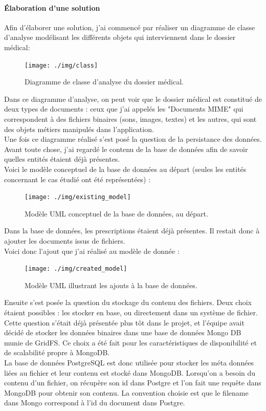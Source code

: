 \paragraph{Élaboration d'une solution\\}
Afin d'élaborer une solution, j'ai commencé par réaliser un diagramme de classe d'analyse modélisant les différents objets qui interviennent dans le dossier médical:

\begin{figure}[H]
  \centering
  \texttt{[image: ./img/class]}
  \caption{\label{fig:mb_va_ast} Diagramme de classe d'analyse du dossier médical.}
\end{figure}

Dans ce diagramme d'analyse, on peut voir que le dossier médical est constitué de deux types de documents : ceux que j'ai appelés les "Documents MIME" qui correspondent à des fichiers binaires (sons, images, textes) et les autres, qui sont des objets métiers manipulés dans l'application.\\

Une fois ce diagramme réalisé s'est posé la question de la persistance des données. Avant toute chose, j'ai regardé le contenu de la base de données afin de savoir quelles entités étaient déjà présentes.\\
Voici le modèle conceptuel de la base de données au départ (seules les entités concernant le cas étudié ont été représentées)  :

\begin{figure}[H]
  \centering
  \texttt{[image: ./img/existing\_model]}
  \caption{\label{fig:mb_va_ast} Modèle UML conceptuel de la base de données, au départ.}
\end{figure}

Dans la base de données, les prescriptions étaient déjà présentes. Il restait donc à ajouter les documents issus de fichiers. \\
Voici donc l'ajout que j'ai réalisé au modèle de donnée : 
\begin{figure}[H]
  \centering
  \texttt{[image: ./img/created\_model]}
  \caption{\label{fig:mb_va_ast} Modèle UML illustrant les ajouts à la base de données.}
\end{figure}

Ensuite s'est posée la question du stockage du contenu des fichiers. Deux choix étaient possibles : les stocker en base, ou directement dans un système de fichier. Cette question s'était déjà présentée plus tôt dans le projet, et l'équipe avait décidé de stocker les données binaires dans une base de données Mongo DB munie de GridFS. Ce choix a été fait pour les caractéristiques de disponibilité et de scalabilité propre à MongoDB.\\
La base de données PostgreSQL est donc utilisée pour stocker les méta données liées au fichier et leur contenu est stocké dans MongoDB. Lorsqu'on a besoin du contenu d'un fichier, on récupère son id dans Postgre et l'on fait une requête dans MongoDB pour obtenir son contenu. La convention choisie est que le filename dans Mongo correspond à l'id du document dans Postgre. \\

